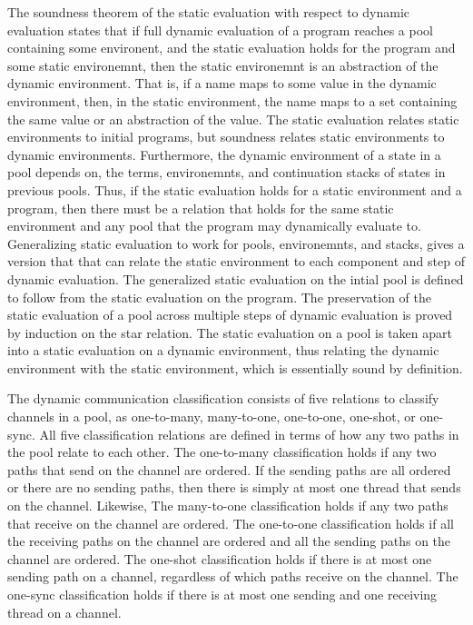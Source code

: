 \documentclass[letterpaper, 11pt]{extarticle}
\begin{document}
The soundness theorem of the static evaluation with respect to dynamic evaluation states that if full dynamic evaluation
of a program reaches a pool containing some environent, and the static evaluation holds for the program and some
static environemnt, then the static environemnt is an abstraction of the dynamic environment. That is, if a name maps
to some value in the dynamic environment, then, in the static environment, the name maps to a set containing the same value
or an abstraction of the value. The static evaluation relates static environments to initial programs,
but soundness relates static environments
to dynamic environments. Furthermore, the dynamic environment of a state in a pool depends on, the terms, environemnts,
and continuation stacks of states in previous pools.
Thus, if the static evaluation holds for a static environment and a program,
then there must be a relation that holds for the same static environment and
any pool that the program may dynamically evaluate to. 
Generalizing static evaluation to work for pools, environemnts, and stacks, gives a version that
that can relate the static environment to each component and step of dynamic evaluation.
The generalized static evaluation on the intial pool is defined to follow from the static evaluation on the program.
The preservation of the static evaluation of a pool across multiple steps of dynamic evaluation is proved by induction on
the star relation. The static evaluation on a pool is taken apart into a static evaluation on a dynamic environment,
thus relating the dynamic environment with the static environment, which is essentially sound by definition. 


The dynamic communication classification consists of five relations to classify channels in a pool, as one-to-many,
many-to-one, one-to-one, one-shot, or one-sync. All five classification relations are defined in terms of how any two paths   
in the pool relate to each other. The one-to-many classification holds if any two paths that send on the channel are ordered. 
If the sending paths are all ordered or there are no sending paths, then there is simply at most one thread that
sends on the channel. Likewise, The many-to-one classification holds if any two paths that receive on the channel are ordered.
The one-to-one classification holds if all the receiving paths on the channel are ordered and all the sending paths on the
channel are ordered. The one-shot classification holds if there is at most one sending path on a channel, regardless
of which paths receive on the channel. The one-sync classification holds if there is at most one sending and one receiving thread on a channel.
\end{document}
